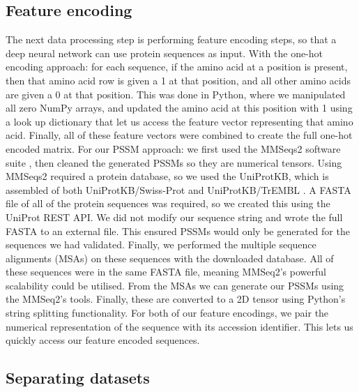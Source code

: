\documentclass{l4proj}
\begin{document}
\subsection{Feature encoding}

The next data processing step is performing feature encoding steps, so that a deep neural network can use protein sequences as input. With the one-hot encoding approach: for each sequence, if the amino acid at a position is present, then that amino acid row is given a 1 at that position, and all other amino acids are given a 0 at that position. This was done in Python, where we manipulated all zero NumPy arrays, and updated the amino acid at this position with 1 using a look up dictionary that let us access the feature vector representing that amino acid. Finally, all of these feature vectors were combined to create the full one-hot encoded matrix. For our PSSM approach: we first used the MMSeqs2 software suite \citep{Steinegger:17}, then cleaned the generated PSSMs so they are numerical tensors. Using MMSeqs2 required a protein database, so we used the UniProtKB, which is assembled of both UniProtKB/Swiss-Prot and UniProtKB/TrEMBL \citep{uniprot:22}. A FASTA file of all of the protein sequences was required, so we created this using the UniProt REST API. We did not modify our sequence string and wrote the full FASTA to an external file. This ensured PSSMs would only be generated for the sequences we had validated. Finally, we performed the multiple sequence alignments (MSAs) on these sequences with the downloaded database. All of these sequences were in the same FASTA file, meaning MMSeq2’s powerful scalability could be utilised. From the MSAs we can generate our PSSMs using the MMSeq2’s tools. Finally, these are converted to a 2D tensor using Python’s string splitting functionality. For both of our feature encodings, we pair the numerical representation of the sequence with its accession identifier. This lets us quickly access our feature encoded sequences.

\subsection{Separating datasets}
\end{document}
